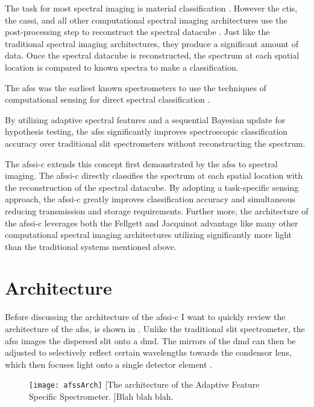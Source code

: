 The task for most spectral imaging is material classification \cite{chang2003hyperspectral, dupont2011spatial, liu2014discriminative}. However the \gls{ctis}, the \gls{cassi}, and all other computational spectral imaging architectures use the post-processing step to reconstruct the spectral datacube \cite{hagen2013review}. Just like the traditional spectral imaging architectures, they produce a significant amount of data. Once the spectral datacube is reconstructed, the spectrum at each spatial location is compared to known spectra to make a classification. 

The \acrfull{afss} was the earliest known spectrometers to use the techniques of computational sensing for direct spectral classification \cite{dinakarababu2011adaptive}.

By utilizing adaptive spectral features and a sequential Bayesian update for hypothesis testing, the \gls{afss} significantly improves spectroscopic classification accuracy over traditional slit spectrometers without reconstructing the spectrum. 

The \gls{afssi-c} extends this concept first demonstrated by the \gls{afss} to spectral imaging. The \gls{afssi-c} directly classifies the spectrum at each spatial location with the reconstruction of the spectral datacube. By adopting a task-specific sensing approach, the \gls{afssi-c} greatly improves classification accuracy and simultaneous reducing transmission and storage requirements. Further more, the architecture of the \gls{afssi-c} leverages both the Fellgett and Jacquinot advantage like many other computational spectral imaging architectures utilizing significantly more light than the traditional systems mentioned above.



\section{Architecture}

Before discussing the architecture of the \gls{afssi-c} I want to quickly review the architecture of the \gls{afss}, is shown in . Unlike the traditional slit spectrometer, the \gls{afss} images the dispersed slit onto a \gls{dmd}. The mirrors of the \gls{dmd} can then be adjusted to selectively reflect certain wavelengths towards the condensor lens, which then focuses light onto a single detector element \cite{dinakarababu2011adaptive}.

\begin{figure}
	\texttt{[image: afssArch]}
	[The architecture of the Adaptive Feature Specific Spectrometer. ]{Blah blah blah.}
	\label{fig:afssArch}
\end{figure}

